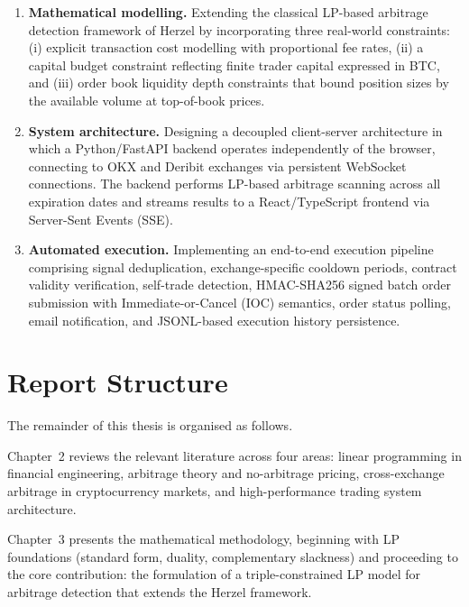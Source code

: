 \documentclass[openany]{book}
\numberwithin{figure}{chapter}
\numberwithin{equation}{chapter}
\begin{document}
\begin{enumerate}
    \item \textbf{Mathematical modelling.} Extending the classical LP-based arbitrage detection framework of Herzel \cite{herzel2005} by incorporating three real-world constraints: (i) explicit transaction cost modelling with proportional fee rates, (ii) a capital budget constraint reflecting finite trader capital expressed in BTC,  and (iii) order book liquidity depth constraints that bound position sizes by the available volume at top-of-book prices.
    
    \item \textbf{System architecture.} Designing a decoupled client-server architecture in which a Python/FastAPI backend operates independently of the browser, connecting to OKX and Deribit exchanges via persistent WebSocket connections. The backend performs LP-based arbitrage scanning across all expiration dates and streams results to a React/TypeScript frontend via Server-Sent Events (SSE).
    
    \item \textbf{Automated execution.} Implementing an end-to-end execution pipeline comprising signal deduplication, exchange-specific cooldown periods, contract validity verification, self-trade detection, HMAC-SHA256 signed batch order submission with Immediate-or-Cancel (IOC) semantics, order status polling, email notification, and JSONL-based execution history persistence.
\end{enumerate}

\section{Report Structure}

The remainder of this thesis is organised as follows.

Chapter~2 reviews the relevant literature across four areas: linear programming in financial engineering, arbitrage theory and no-arbitrage pricing, cross-exchange arbitrage in cryptocurrency markets, and high-performance trading system architecture.

Chapter~3 presents the mathematical methodology, beginning with LP foundations (standard form, duality, complementary slackness) and proceeding to the core contribution: the formulation of a triple-constrained LP model for arbitrage detection that extends the Herzel \cite{herzel2005} framework.
\end{document}
